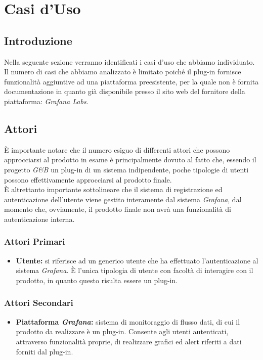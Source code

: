 \section{Casi d'Uso}\label{CasiUso}
\subsection{Introduzione}\label{CasiUso_Introduzione}
Nella seguente sezione verranno identificati i casi d'uso che abbiamo individuato.\\
Il numero di casi che abbiamo analizzato è limitato poiché il plug-in fornisce funzionalità aggiuntive ad una piattaforma preesistente, per la quale non è fornita documentazione in quanto già disponibile presso il sito web del fornitore della piattaforma: \textit{Grafana Labs}.

\subsection{Attori}\label{Attori}
È importante notare che il numero esiguo di differenti attori che possono approcciarsi al prodotto in esame è principalmente dovuto al fatto che, essendo il progetto \textit{G\&B} un plug-in di un sistema indipendente, poche tipologie di utenti possono effettivamente approcciarsi al prodotto finale.\\
È altrettanto importante sottolineare che il sistema di registrazione ed autenticazione dell'utente viene gestito interamente dal sistema \textit{Grafana}, dal momento che, ovviamente, il prodotto finale non avrà una funzionalità di autenticazione interna.

\subsubsection*{Attori Primari}
\begin{itemize}
\item \textbf{Utente:} si riferisce ad un generico utente che ha effettuato l'autenticazione al sistema \textit{Grafana}. È l'unica tipologia di utente con facoltà di interagire con il prodotto, in quanto questo risulta essere un plug-in.
\end{itemize}

\subsubsection*{Attori Secondari}
\begin{itemize}
\item \textbf{Piattaforma \textit{Grafana}:} sistema di monitoraggio di flusso dati, di cui il prodotto da realizzare è un plug-in. Consente agli utenti autenticati, attraverso funzionalità proprie, di realizzare grafici ed alert riferiti a dati forniti dal plug-in.
\end{itemize}

